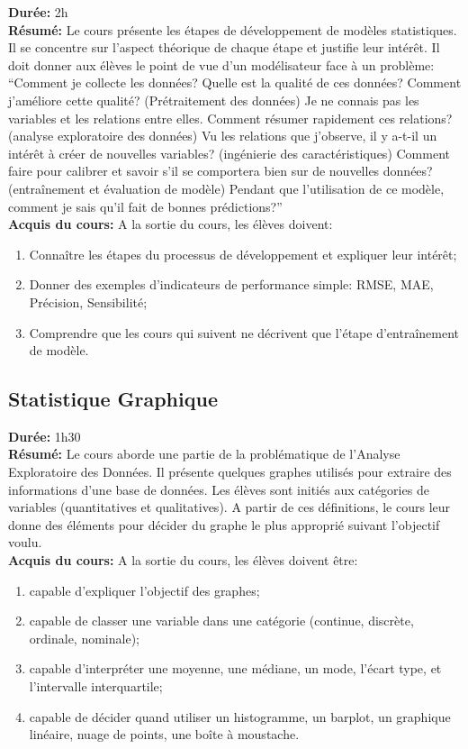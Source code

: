 \documentclass[12pt,a4paper]{article}
\begin{document}
\textbf{Durée:} 2h\\
\textbf{Résumé:} Le cours présente les étapes de développement de modèles statistiques. Il se concentre sur l’aspect théorique de chaque étape et justifie leur intérêt. Il doit donner aux élèves le point de vue d’un modélisateur face à un problème: “Comment je collecte les données? Quelle est la qualité de ces données? Comment j’améliore cette qualité? (Prétraitement des données) Je ne connais pas les variables et les relations entre elles. Comment résumer rapidement ces relations? (analyse exploratoire des données) Vu les relations que j’observe, il y a-t-il un intérêt à créer de nouvelles variables? (ingénierie des caractéristiques) Comment faire pour calibrer et savoir s’il se comportera bien sur de nouvelles données? (entraînement et évaluation de modèle) Pendant que l’utilisation de ce modèle, comment je sais qu’il fait de bonnes prédictions?”\\
\textbf{Acquis du cours:} A la sortie du cours, les élèves doivent:
\begin{enumerate}
\item Connaître les étapes du processus de développement et expliquer leur intérêt;
\item Donner des exemples d’indicateurs de performance simple: RMSE, MAE,  Précision, Sensibilité;
\item Comprendre que les cours qui suivent ne décrivent que l’étape d’entraînement de modèle.
\end{enumerate}


\subsection{Statistique Graphique}

\textbf{Durée:} 1h30\\
\textbf{Résumé:} Le cours aborde une partie de la problématique de l’Analyse Exploratoire des Données. Il présente quelques graphes utilisés pour extraire des informations d’une base de données. Les élèves sont initiés aux catégories de variables (quantitatives et qualitatives). A partir de ces définitions, le cours leur donne des éléments pour décider du graphe le plus approprié suivant l’objectif voulu.\\
\textbf{Acquis du cours:} A la sortie du cours, les élèves doivent être:
\begin{enumerate}
\item capable d’expliquer l’objectif des graphes;
\item capable de classer une variable dans une catégorie (continue, discrète, ordinale, nominale);
\item capable d’interpréter une moyenne, une médiane,  un mode, l’écart type, et l’intervalle interquartile;
\item capable de décider quand utiliser un histogramme, un barplot, un graphique linéaire, nuage de points, une boîte à moustache.
\end{enumerate}
\end{document}
